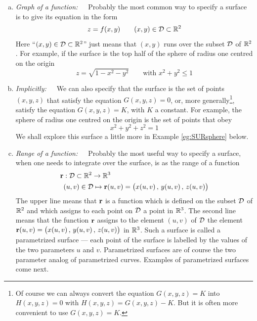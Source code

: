 \begin{enumerate}[(a)]
\item \emph{Graph of a function:}\ \ \  Probably the most common way 
to specify a surface is to give its equation in the form
\begin{equation*}
 z = f(x,y)\qquad (x,y)\in\mathcal{D}\subset\mathbb{R}^2
\end{equation*} 
Here ``{$(x,y)\in\mathcal{D}\subset\mathbb{R}^2$}'' just means that $(x,y)$ runs over the
subset $\mathcal{D}$ of $\mathbb{R}^2$.
For example, if the surface is the top half of the sphere of radius 
one centred on the origin
\begin{equation*}
 z = \sqrt{1-x^2-y^2}\qquad \text{with } x^2+y^2 \le 1
\end{equation*} 

\item \emph{Implicitly:}\ \ \ We can also specify that the surface 
is the set of points $(x,y,z)$ that satisfy the equation
$G(x,y,z)=0$, or, more generally\footnote{Of course we can always
convert the equation $G(x,y,z)=K$ into $H(x,y,z)=0$ 
with $H(x,y,z)=G(x,y,z)-K$. But it is often more convenient to use $G(x,y,z)=K$.}, satisfy the equation $G(x,y,z)=K$,
with $K$ a constant. For example, the sphere of radius 
one centred on the origin is the set of points that obey
\begin{equation*}
x^2+y^2+z^2=1
\end{equation*}
We shall explore this surface a little more in Example
\ref{eg:SURsphere} below.

\item \emph{Range of a function:}\ \ \  Probably the most useful
way to specify a surface, when one needs to integrate over the surface,
is as the range of a function
\begin{align*}
\mathbf{r}&: \mathcal{D}\subset\mathbb{R}^2 \rightarrow \mathbb{R}^3 \\
   &(u,v) \in\mathcal{D} \mapsto \mathbf{r}(u,v) =\big(x(u,v)\,,\,y(u,v)\,,\,z(u,v)\big)
\end{align*}
The upper line means that $\mathbf{r}$ is a function which is defined on the subset
$\mathcal{D}$ of $\mathbb{R}^2$ and which assigns to each point on $\mathcal{D}$ a point 
in $\mathbb{R}^3$.
The second line means that the function $\mathbf{r}$ assigns to the element
$(u,v)$ of $\mathcal{D}$ the element  $\mathbf{r}(u,v) =\big(x(u,v)\,,\,y(u,v)\,,\,z(u,v)\big)$
in $\mathbb{R}^3$. Such a surface is called a parametrized surface --- each point 
of the surface is labelled by the values of the two parameters $u$ and $v$.
Parametrized surfaces are of course the two parameter analog of parametrized 
curves. Examples of parametrized surfaces come next. 
\end{enumerate}


